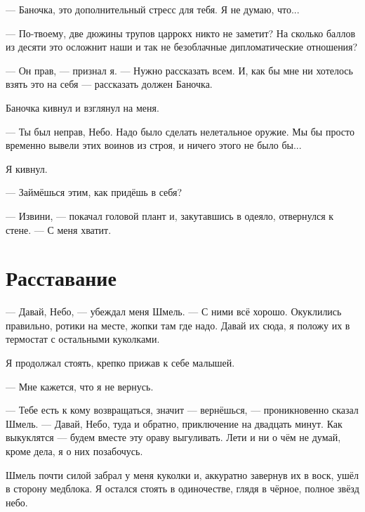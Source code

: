 \documentclass[a4paper,12pt,fleqn]{book}\usepackage{polyglossia}\setdefaultlanguage[babelshorthands=true]{russian}\setotherlanguage{english}\defaultfontfeatures{Ligatures=TeX,Mapping=tex-text}\usepackage{xcolor}\newcommand{\ml}[3]{#2}
\newcommand{\Tesarrokch}{Te's\'{a}rr\r{o}kch}
\begin{document}
{--- Баночка, это дополнительный стресс для тебя.
Я не думаю, что...

\ml{$0$}
{--- По-твоему, две дюжины трупов царрокх никто не заметит?}
{``You think two dozens of dead \Tesarrokch\ remain unnoticed?}
\ml{$0$}
{На сколько баллов из десяти это осложнит наши и так не безоблачные дипломатические отношения?}
{On a scale of one to ten, how difficult will be our diplomatic relations, which, actually, have never been cloudless before?''}

\ml{$0$}
{--- Он прав, --- признал я.}
{``He's right,'' I admitted.}
\ml{$0$}
{--- Нужно рассказать всем.}
{``Everyone should know.}
\ml{$0$}
{И, как бы мне ни хотелось взять это на себя --- рассказать должен Баночка.}
{And as much as I want to take this burden, Flask must be the one to tell.''}

Баночка кивнул и взглянул на меня.

--- Ты был неправ, Небо.
\ml{$0$}
{Надо было сделать нелетальное оружие.}
{We should've made non-lethal weapons.}
\ml{$0$}
{Мы бы просто временно вывели этих воинов из строя, и ничего этого не было бы...}
{We could disable those warriors for a while, and none of that would've ever happened ....''}

Я кивнул.

--- Займёшься этим, как придёшь в себя?

--- Извини, --- покачал головой плант и, закутавшись в одеяло, отвернулся к стене.
\ml{$0$}
{--- С меня хватит.}
{``I'm done.''}

\section{Расставание}

--- Давай, Небо, --- убеждал меня Шмель.
--- С ними всё хорошо.
Окуклились правильно, ротики на месте, жопки там где надо.
Давай их сюда, я положу их в термостат с остальными куколками.

Я продолжал стоять, крепко прижав к себе малышей.

--- Мне кажется, что я не вернусь.

--- Тебе есть к кому возвращаться, значит --- вернёшься, --- проникновенно сказал Шмель.
\ml{$0$}
{--- Давай, Небо, туда и обратно, приключение на двадцать минут.}
{``Come on, Sky, there and back again, twenty minute adventure.}
Как выкуклятся --- будем вместе эту ораву выгуливать.
Лети и ни о чём не думай, кроме дела, я о них позабочусь.

Шмель почти силой забрал у меня куколки и, аккуратно завернув их в воск, ушёл в сторону медблока.
Я остался стоять в одиночестве, глядя в чёрное, полное звёзд небо.

}
\end{document}
